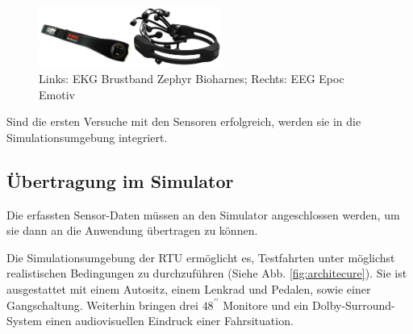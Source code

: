 {\begin{figure}[h] 
  \begin{center}
    \includegraphics[width=6cm]{img/sensors}
    \caption{Links: EKG Brustband Zephyr Bioharnes; Rechts: EEG Epoc Emotiv}
    \label{fig:sensors}
  \end{center}
\end{figure}

Sind die ersten Versuche mit den Sensoren erfolgreich, werden sie in die Simulationsumgebung integriert.


\subsection{Übertragung im Simulator}
\label{subsec:sim}
Die erfassten Sensor-Daten müssen an den Simulator angeschlossen werden, um sie dann an die Anwendung übertragen zu können.

Die Simulationsumgebung der \acl{RTU} ermöglicht es, Testfahrten unter möglichst realistischen Bedingungen zu durchzuführen (Siehe Abb. \ref{fig:architecure}). Sie ist ausgestattet mit einem Autositz, einem Lenkrad und Pedalen, sowie einer Gangschaltung. Weiterhin bringen drei $48^{\prime\prime}$ Monitore und ein Dolby-Surround-System einen audiovisuellen Eindruck einer Fahrsituation.\\

}
